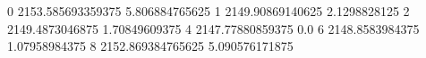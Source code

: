 0 2153.585693359375 5.806884765625
1 2149.90869140625 2.1298828125
2 2149.4873046875 1.70849609375
4 2147.77880859375 0.0
6 2148.8583984375 1.07958984375
8 2152.869384765625 5.090576171875
